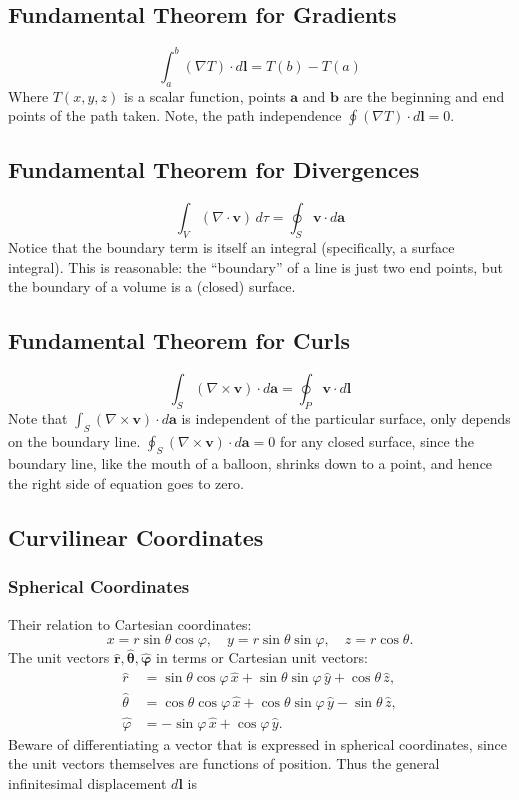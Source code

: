 \documentclass[12pt]{book}
\begin{document}
\subsection{Fundamental Theorem for Gradients}
\[
\int_{a}^{b} (\nabla T) \cdot d\mathbf{l} = T(b) - T(a)
\]
Where $T(x, y, z)$ is a scalar function, points $\mathbf{a}$ and $\textbf{b}$ are the beginning and end points of the path taken. Note, the path independence $\oint (\nabla T) \cdot d\mathbf{l} = 0
$. 

\subsection{Fundamental Theorem for Divergences}
\[
\int_V (\nabla \cdot \mathbf{v}) \, d\tau = \oint_S \mathbf{v} \cdot d\mathbf{a}
\]
Notice that the boundary term is itself an integral (specifically, a surface
integral). This is reasonable: the “boundary” of a line is just two end points, but
the boundary of a volume is a (closed) surface.

\subsection{Fundamental Theorem for Curls}
\[
\int_S (\nabla \times \mathbf{v}) \cdot d\mathbf{a} = \oint_P \mathbf{v} \cdot d\mathbf{l}
\]
Note that $\int_S (\nabla \times \mathbf{v}) \cdot d\mathbf{a}$ is independent of the particular surface, only depends on the boundary line. $\oint_S (\nabla \times \mathbf{v}) \cdot d\mathbf{a}=0$ for any closed surface, since the
boundary line, like the mouth of a balloon, shrinks down to a point, and hence the right side of equation goes to zero.
\subsection{Curvilinear Coordinates}
\subsubsection{Spherical Coordinates}
Their relation to Cartesian coordinates:
\[
x = r \sin \theta \cos \varphi, \quad
y = r \sin \theta \sin \varphi, \quad
z = r \cos \theta.
\]
The unit vectors $\mathbf{\hat{r},\hat{\theta}, \hat{\varphi}}$ in terms or Cartesian unit vectors:
\begin{align*}
\hat{r} &= \sin \theta \cos \varphi \, \hat{x} + \sin \theta \sin \varphi \, \hat{y} + \cos \theta \, \hat{z}, \\
\hat{\theta} &= \cos \theta \cos \varphi \, \hat{x} + \cos \theta \sin \varphi \, \hat{y} - \sin \theta \, \hat{z}, \\
\hat{\varphi} &= -\sin \varphi \, \hat{x} + \cos \varphi \, \hat{y}.
\end{align*}
Beware of differentiating a vector that is expressed in
spherical coordinates, since the unit vectors themselves are functions of position. Thus the general infinitesimal displacement \( d\mathbf{l} \) is
\end{document}
